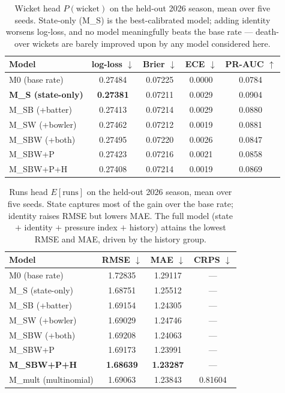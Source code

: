 \begin{table}[t]
\centering
\small
\begin{tabular}{lcccc}
\toprule
Model & log-loss $\downarrow$ & Brier $\downarrow$ & ECE $\downarrow$ & PR-AUC $\uparrow$ \\
\midrule
M0 (base rate)   & 0.27484 & 0.07225 & 0.0000 & 0.0784 \\
\textbf{M\_S (state-only)} & \textbf{0.27381} & 0.07211 & 0.0029 & 0.0904 \\
M\_SB (+batter)  & 0.27413 & 0.07214 & 0.0029 & 0.0880 \\
M\_SW (+bowler)  & 0.27462 & 0.07212 & 0.0019 & 0.0881 \\
M\_SBW (+both)   & 0.27495 & 0.07220 & 0.0026 & 0.0847 \\
M\_SBW+P         & 0.27423 & 0.07216 & 0.0021 & 0.0858 \\
M\_SBW+P+H       & 0.27408 & 0.07214 & 0.0019 & 0.0869 \\
\bottomrule
\end{tabular}
\caption{Wicket head $P(\text{wicket})$ on the held-out 2026 season, mean over
five seeds. State-only (M\_S) is the best-calibrated model; adding identity
worsens log-loss, and no model meaningfully beats the base rate --- death-over
wickets are barely improved upon by any model considered here.}
\label{tab:wicket}
\end{table}

\begin{table}[t]
\centering
\small
\begin{tabular}{lccc}
\toprule
Model & RMSE $\downarrow$ & MAE $\downarrow$ & CRPS $\downarrow$ \\
\midrule
M0 (base rate)   & 1.72835 & 1.29117 & --- \\
M\_S (state-only) & 1.68751 & 1.25512 & --- \\
M\_SB (+batter)  & 1.69154 & 1.24305 & --- \\
M\_SW (+bowler)  & 1.69029 & 1.24746 & --- \\
M\_SBW (+both)   & 1.69208 & 1.24063 & --- \\
M\_SBW+P         & 1.69173 & 1.23991 & --- \\
\textbf{M\_SBW+P+H} & \textbf{1.68639} & \textbf{1.23287} & --- \\
M\_mult (multinomial) & 1.69063 & 1.23843 & 0.81604 \\
\bottomrule
\end{tabular}
\caption{Runs head $E[\text{runs}]$ on the held-out 2026 season, mean over five
seeds. State captures most of the gain over the base rate; identity raises RMSE
but lowers MAE. The full model (state $+$ identity $+$ pressure index $+$ history)
attains the lowest RMSE and MAE, driven by the history group.}
\label{tab:runs}
\end{table}

